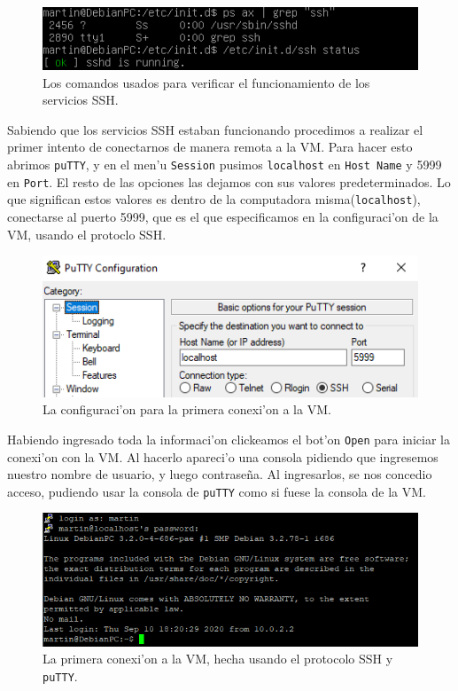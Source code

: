 \documentclass[11pt]{article}
\begin{document}
		\begin{figure}[H]
    			\centering
    			\includegraphics[scale=0.8]{Images/Config/SSH_check.PNG}
    			\caption{Los comandos usados para verificar el funcionamiento de los servicios SSH.}
    			\label{fig:SSH_check}
		\end{figure}
		
		Sabiendo que los servicios SSH estaban funcionando procedimos a realizar el primer intento de conectarnos de manera remota a la VM. Para hacer esto abrimos \texttt{puTTY}, y en el men'u \texttt{Session} pusimos \texttt{localhost} en \texttt{Host Name} y 5999 en \texttt{Port}. El resto de las opciones las dejamos con sus valores predeterminados. Lo que significan estos valores es dentro de la computadora misma(\texttt{localhost}), conectarse al puerto 5999, que es el que especificamos en la configuraci'on de la VM, usando el protoclo SSH.
		
		\begin{figure}[H]
    			\centering
    			\includegraphics[scale=0.9]{Images/Connection/first_connection_attempt.PNG}
    			\caption{La configuraci'on para la primera conexi'on a la VM.}
    			\label{fig:first_connection_attempt}
		\end{figure}
		
		Habiendo ingresado toda la informaci'on clickeamos el bot'on \texttt{Open} para iniciar la conexi'on con la VM. Al hacerlo apareci'o una consola pidiendo que ingresemos nuestro nombre de usuario, y luego contraseña. Al ingresarlos, se nos concedio acceso, pudiendo usar la consola de \texttt{puTTY} como si fuese la consola de la VM. 
		
		\begin{figure}[H]
    			\centering
    			\captionsetup{justification=centering}
    			\includegraphics[width=0.9\linewidth]{Images/Connection/first_connection_console.PNG}
    			\caption{La primera conexi'on a la VM, hecha usando el protocolo SSH y \texttt{puTTY}.}
    			\label{fig:first_connection_console}
		\end{figure}
		
\end{document}

